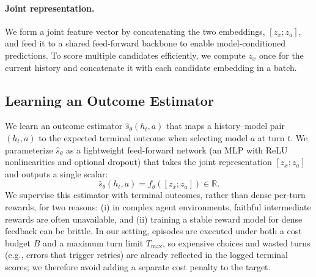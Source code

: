 

\paragraph{Joint representation.}
We form a joint feature vector by concatenating the two embeddings, $[z_x;z_a]$, and feed it to a shared feed-forward backbone to enable model-conditioned predictions.
To score multiple candidates efficiently, we compute $z_x$ once for the current history and concatenate it with each candidate embedding in a batch.

\subsection{Learning an Outcome Estimator}
\label{sec:learning}

We learn an outcome estimator $\hat{s}_\theta(h_t,a)$ that maps a history--model pair $(h_t,a)$ to the expected terminal outcome when selecting model $a$ at turn $t$.
We parameterize $\hat{s}_\theta$ as a lightweight feed-forward network (an MLP with ReLU nonlinearities and optional dropout) that takes the joint representation $[z_x;z_a]$ and outputs a single scalar:
\begin{equation}
\hat{s}_\theta(h_t,a)=f_\theta([z_x;z_a])\in\mathbb{R}.
\end{equation}
We supervise this estimator with terminal outcomes, rather than dense per-turn rewards, for two reasons: (i) in complex agent environments, faithful intermediate rewards are often unavailable, and (ii) training a stable reward model for dense feedback can be brittle.
In our setting, episodes are executed under both a cost budget $B$ and a maximum turn limit $T_{\max}$, so expensive choices and wasted turns (e.g., errors that trigger retries) are already reflected in the logged terminal scores; we therefore avoid adding a separate cost penalty to the target.

